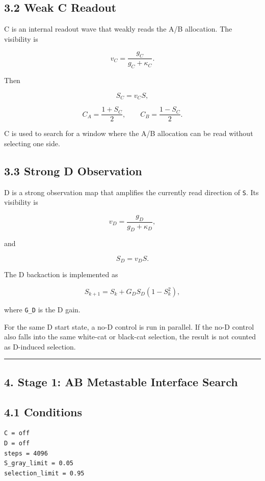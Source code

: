 \documentclass{article}
\begin{document}
\subsection{3.2 Weak C Readout}\label{weak-c-readout}

C is an internal readout wave that weakly reads the A/B allocation. The
visibility is

\[
v_C=\frac{g_C}{g_C+\kappa_C}.
\]

Then

\[
S_C=v_CS,
\]

\[
C_A=\frac{1+S_C}{2},
\qquad
C_B=\frac{1-S_C}{2}.
\]

C is used to search for a window where the A/B allocation can be read
without selecting one side.

\subsection{3.3 Strong D Observation}\label{strong-d-observation}

D is a strong observation map that amplifies the currently read
direction of \texttt{S}. Its visibility is

\[
v_D=\frac{g_D}{g_D+\kappa_D},
\]

and

\[
S_D=v_DS.
\]

The D backaction is implemented as

\[
S_{k+1}
=
S_k
+
G_D S_D(1-S_k^2),
\]

where \texttt{G\_D} is the D gain.

For the same D start state, a no-D control is run in parallel. If the
no-D control also falls into the same white-cat or black-cat selection,
the result is not counted as D-induced selection.

\begin{center}\rule{0.5\linewidth}{0.5pt}\end{center}

\subsection{4. Stage 1: AB Metastable Interface
Search}\label{stage-1-ab-metastable-interface-search}

\subsection{4.1 Conditions}\label{conditions}

\begin{verbatim}
C = off
D = off
steps = 4096
S_gray_limit = 0.05
selection_limit = 0.95
\end{verbatim}
\end{document}
